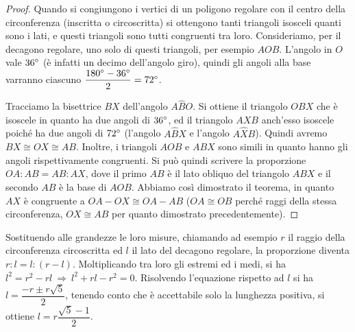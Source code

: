 \begin{figure*}[!htb]
	\begin{center}
		\begin{minipage}{0.45\textwidth}
			\centering
			
		\end{minipage}
		\hspace{0.03\textwidth}	
		\begin{minipage}{0.45\textwidth}
			\centering
			
		\end{minipage}
	\end{center}
\end{figure*}

\begin{proof}
Quando si congiungono i vertici di un poligono regolare con il centro della circonferenza (inscritta o circoscritta) si ottengono tanti triangoli isosceli quanti sono i lati, e questi triangoli sono tutti congruenti tra loro.
Consideriamo, per il decagono regolare, uno solo di questi triangoli, per esempio $AOB$. L'angolo in $O$ vale $36{}^{\circ}$ (è infatti un decimo dell'angolo giro), quindi gli angoli alla base varranno ciascuno $\dfrac{180{}^{\circ}-36{}^{\circ}}{2} = 72{}^{\circ}$.

Tracciamo la bisettrice $BX$ dell'angolo $A\widehat{B}O$. Si ottiene il triangolo $OBX$ che è isoscele in quanto ha due angoli di $36{}^{\circ}$, ed il triangolo $AXB$ anch'esso isoscele poiché ha due angoli di $72{}^{\circ}$ (l'angolo $A\widehat{B}X$ e l'angolo $A\widehat{X}B$).  
Quindi avremo $BX\cong OX\cong AB$.
Inoltre, i triangoli $AOB$ e $ABX$ sono simili in quanto hanno gli angoli rispettivamente congruenti.
Si può quindi scrivere la proporzione $OA:AB=AB:AX$, dove il primo $AB$ è il lato obliquo del triangolo $ABX$ e il secondo $AB$ è la base di $AOB$.
Abbiamo così dimostrato il teorema, in quanto $AX$ è congruente a $OA-OX \cong OA-AB$ ($OA\cong OB$ perché raggi della stessa circonferenza, $OX\cong AB$ per quanto dimostrato precedentemente).
\end{proof}

Sostituendo alle grandezze le loro misure, chiamando ad esempio $r$ il raggio della circonferenza circoscritta ed $l$ il lato del decagono regolare, la proporzione diventa $r:l=l:(r-l)$.
Moltiplicando tra loro gli estremi ed i medi, si ha $l^2=r^2-rl \:\Rightarrow\: l^2+rl-r^2=0$.
Risolvendo l'equazione rispetto ad $l$ si ha $l=\dfrac{-r\pm r\sqrt{5}}{2}$, tenendo conto che è accettabile solo la lunghezza positiva, si ottiene $l=r\dfrac{\sqrt{5}-1}{2}$.

